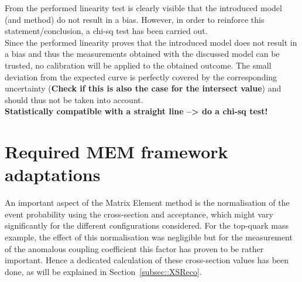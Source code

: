 From the performed linearity test is clearly visible that the introduced model (and method) do not result in a bias.
However, in order to reinforce this statement/conclusion, a chi-sq test has been carried out.
\\
Since the performed linearity proves that the introduced model does not result in a bias and thus the measurements obtained with the discussed model can be trusted, no calibration will be applied to the obtained outcome. The small deviation from the expected curve is perfectly covered by the corresponding uncertainty (\textbf{Check if this is also the case for the intersect value}) and should thus not be taken into account.
\\

\textbf{Statistically compatible with a straight line --> do a chi-sq test!}


\section{Required MEM framework adaptations} \label{sec::RecoAdapt}

An important aspect of the Matrix Element method is the normalisation of the event probability using the cross-section and acceptance, which might vary significantly for the different configurations considered. For the top-quark mass example, the effect of this normalisation was negligible but for the measurement of the anomalous coupling coefficient this factor has proven to be rather important. 
Hence a dedicated calculation of these cross-section values has been done, as will be explained in Section~\ref{subsec::XSReco}.
\\

